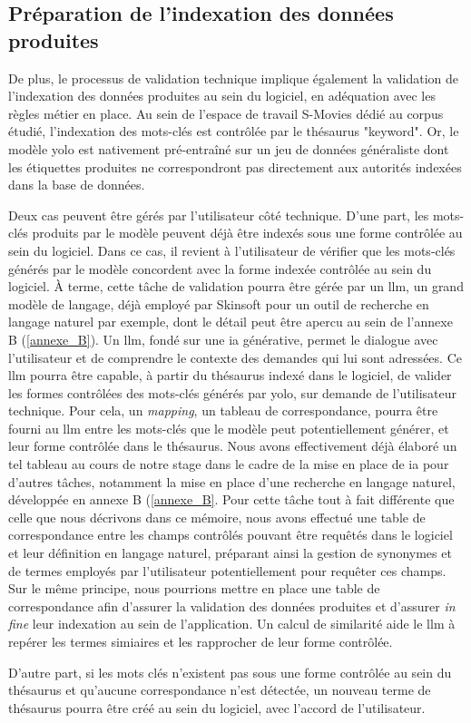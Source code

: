 \subsection{Préparation de l'indexation des données produites}

De plus, le processus de validation technique implique également la validation de l'indexation des données produites au sein du logiciel, en adéquation avec les règles métier en place. Au sein de l’espace de travail S-Movies dédié au corpus étudié, l'indexation des mots-clés est contrôlée par le thésaurus "keyword". Or, le modèle \gls{yolo} est nativement pré-entraîné sur un jeu de données généraliste dont les étiquettes produites ne correspondront pas directement aux autorités indexées dans la base de données. 

Deux cas peuvent être gérés par l'utilisateur côté technique. D'une part, les mots-clés produits par le modèle peuvent déjà être indexés sous une forme contrôlée au sein du logiciel. Dans ce cas, il revient à l'utilisateur de vérifier que les mots-clés générés par le modèle concordent avec la forme indexée contrôlée au sein du logiciel. À terme, cette tâche de validation pourra être gérée par un \gls{llm}, un grand modèle de langage, déjà employé par Skinsoft pour un outil de recherche en langage naturel par exemple, dont le détail peut être apercu au sein de l'annexe B (\cref{annexe_B}). Un \gls{llm}, fondé sur une \gls{ia} générative, permet le dialogue avec l'utilisateur et de comprendre le contexte des demandes qui lui sont adressées. Ce \gls{llm} pourra être capable, à partir du thésaurus indexé dans le logiciel, de valider les formes contrôlées des mots-clés générés par \gls{yolo}, sur demande de l'utilisateur technique. Pour cela, un \textit{mapping}, un tableau de correspondance, pourra être fourni au \gls{llm} entre les mots-clés que le modèle peut potentiellement générer, et leur forme contrôlée dans le thésaurus. Nous avons effectivement déjà élaboré un tel tableau au cours de notre stage dans le cadre de la mise en place de \gls{ia} pour d'autres tâches, notamment la mise en place d'une recherche en langage naturel, développée en annexe B (\ref{annexe_B}. Pour cette tâche tout à fait différente que celle que nous décrivons dans ce mémoire, nous avons effectué une table de correspondance entre les champs contrôlés pouvant être requêtés dans le logiciel et leur définition en langage naturel, préparant ainsi la gestion de synonymes et de termes employés par l'utilisateur potentiellement pour requêter ces champs. Sur le même principe, nous pourrions mettre en place une table de correspondance afin d'assurer la validation des données produites et d'assurer \textit{in fine} leur indexation au sein de l'application. Un calcul de similarité aide le \gls{llm} à repérer les termes simiaires et les rapprocher de leur forme contrôlée.

D'autre part, si les mots clés n'existent pas sous une forme contrôlée au sein du thésaurus et qu'aucune correspondance n'est détectée, un nouveau terme de thésaurus pourra être créé au sein du logiciel, avec l'accord de l'utilisateur.
